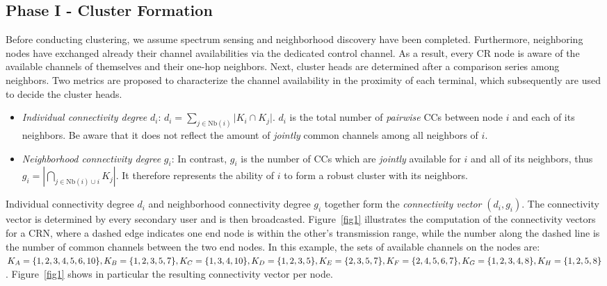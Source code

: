 \documentclass[times]{ettauth}
\theoremstyle{mytheoremstyle}
\theoremstyle{mytheoremstyle}
\theoremstyle{mytheoremstyle}
\begin{document}
\subsection{Phase I - Cluster Formation}
\label{phaseI}
Before conducting clustering, we assume spectrum sensing and neighborhood discovery have been completed.
Furthermore, neighboring nodes have exchanged already their channel availabilities via the dedicated control channel. 
As a result, every CR node is aware of the available channels of themselves and their one-hop neighbors.
Next, cluster heads are determined after a comparison series among neighbors.
Two metrics are proposed to characterize the channel availability in the proximity of each terminal, which subsequently are used to decide the cluster heads.
\begin{itemize}

\item \textit{Individual connectivity degree} $d_i$: $d_i=\sum_{j\in \text{Nb}(i)}\vert K_i\cap K_j\vert$. 
$d_i$ is the total number of \textit{pairwise} CCs between node $i$ and each of its neighbors. Be aware that it does not reflect the amount of \textit{jointly} common channels among all neighbors of $i$.
\item \textit{Neighborhood connectivity degree} $g_i$: In contrast, $g_i$ is the number of CCs which are \textit{jointly} available for $i$ and all of its neighbors, thus
$g_i=|\bigcap_{j\in \text{Nb}(i)\cup i}K_j|$. It therefore represents the ability of $i$ to form a robust cluster with its neighbors.
\end{itemize}
Individual connectivity degree $d_i$ and neighborhood connectivity degree $g_i$ together form the \textit{connectivity vector} $(d_i, g_i)$.
The connectivity vector is determined by every secondary user and is then broadcasted.
Figure~\ref{fig1} illustrates the computation of the connectivity vectors for a CRN, where a dashed edge indicates one end node is within the other's transmission range, while the number along the dashed line is the number of common channels between the two end nodes.
In this example, the sets of available channels on the nodes are: $K_A=\{1,2,3,4,5,6,10\}, K_B=\{1,2,3,5,7\}, \\K_C=\{1,3,4,10\}, K_D=\{1,2,3,5\}, \\K_E=\{2,3,5,7\}, K_F=\{2,4,5,6,7\}, \\K_G=\{1,2,3,4,8\}, K_H=\{1,2,5,8\}$. 
Figure~\ref{fig1} shows in particular the resulting connectivity vector per node.
\end{document}
